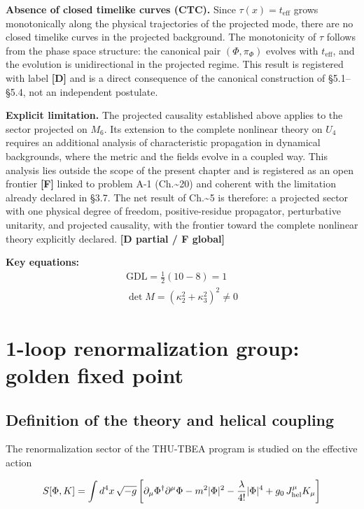 ﻿\documentclass[11pt,letterpaper]{article}
\begin{document}
\textbf{Absence of closed timelike curves (CTC).} Since $\tau(x) = t_{\text{eff}}$ grows monotonically along the physical trajectories of the projected mode, there are no closed timelike curves in the projected background. The monotonicity of $\tau$ follows from the phase space structure: the canonical pair $(\Phi, \pi_\Phi)$ evolves with $t_{\text{eff}}$, and the evolution is unidirectional in the projected regime. This result is registered with label \textbf{[D]} and is a direct consequence of the canonical construction of §5.1--§5.4, not an independent postulate.

\textbf{Explicit limitation.} The projected causality established above applies to the sector projected on $M_6$. Its extension to the complete nonlinear theory on $U_4$ requires an additional analysis of characteristic propagation in dynamical backgrounds, where the metric and the fields evolve in a coupled way. This analysis lies outside the scope of the present chapter and is registered as an open frontier \textbf{[F]} linked to problem A-1 (Ch.\textasciitilde{}20) and coherent with the limitation already declared in §3.7. The net result of Ch.\textasciitilde{}5 is therefore: a projected sector with one physical degree of freedom, positive-residue propagator, perturbative unitarity, and projected causality, with the frontier toward the complete nonlinear theory explicitly declared. \textbf{[D partial / F global]}

\textbf{Key equations:}
\begin{align*}
    \mathrm{GDL} = \frac{1}{2}(10-8) = 1 \\
    \det M = (\kappa_2^2+\kappa_3^2)^2 \neq 0
\end{align*}
\section{1-loop renormalization group: golden fixed point}
\subsection{Definition of the theory and helical coupling}
The renormalization sector of the THU-TBEA program is studied on the effective action

\begin{equation*}
  \resizebox{\ifdim\width>\linewidth \linewidth\else\width\fi}{!}{$\displaystyle S[\Phi, K] = \int d^4x\,\sqrt{-g}\left[\partial_\mu \Phi^\dagger \partial^\mu \Phi - m^2 |\Phi|^2 - \frac{\lambda}{4!}|\Phi|^4 + g_0\, J_{\text{hel}}^\mu K_\mu\right]$}
\end{equation*}
\end{document}
